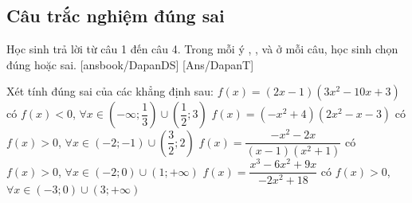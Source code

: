 \subsection{Câu trắc nghiệm đúng sai}
Học sinh trả lời từ câu 1 đến câu 4.
Trong mỗi ý , ,  và  ở mỗi câu, học sinh chọn đúng hoặc sai.
\setcounter{ex}{0}
\LGexTF
{}[ansbook/DapanDS]
[Ans/DapanT]
\begin{ex}%
	Xét tính đúng sai của các khẳng định sau:
	\choiceTF
	{\True $f(x)=(2x-1)(3x^2-10x+3)$ có $f(x)<0$, $\forall x\in\left( -\infty; \dfrac{1}{3}\right) \cup \left( \dfrac{1}{2}; 3\right)$}
	{\True $f(x)=(-x^2+4)(2x^2-x-3)$ có $f(x)>0$, $\forall x\in\left( -2; -1\right) \cup \left( \dfrac{3}{2}; 2\right)$}
	{$f(x)=\dfrac{-x^2-2x}{(x-1)(x^2+1)}$ có $f(x)>0$, $\forall x\in\left( -2; 0\right) \cup \left( 1; +\infty\right)$}
	{$f(x)=\dfrac{x^3-6x^2+9x}{-2x^2+18}$ có $f(x)>0$, $\forall x\in\left( -3; 0\right) \cup \left(3; +\infty\right)$} 
\end{ex}
